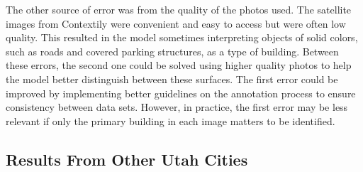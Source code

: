 \documentclass[conference,]{IEEEtran}
\begin{document}
The other source of error was from the quality of the photos used. The
satellite images from Contextily were convenient and easy to access but
were often low quality. This resulted in the model sometimes
interpreting objects of solid colors, such as roads and covered parking
structures, as a type of building. Between these errors, the second one
could be solved using higher quality photos to help the model better
distinguish between these surfaces. The first error could be improved by
implementing better guidelines on the annotation process to ensure
consistency between data sets. However, in practice, the first error may
be less relevant if only the primary building in each image matters to
be identified.

\subsection{Results From Other Utah
Cities}\label{results-from-other-utah-cities}
\end{document}
